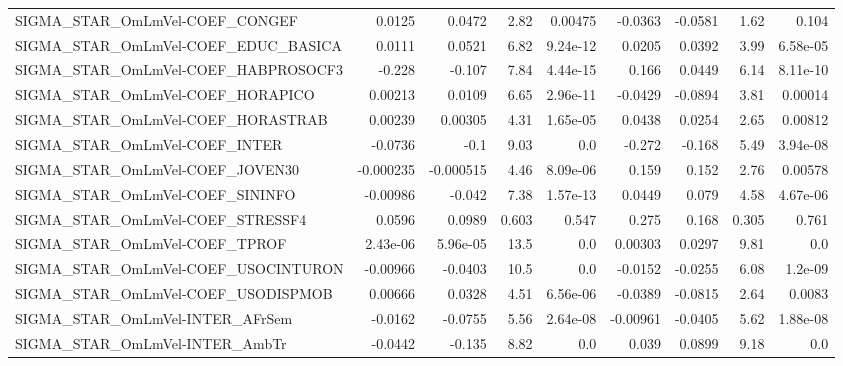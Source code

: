 \begin{tabular}{lrrrrrrrr}
SIGMA\_STAR\_OmLmVel-COEF\_CONGEF         &      0.0125 &       0.0472 &     2.82 &  0.00475 &    -0.0363 &     -0.0581 &         1.62 &         0.104 \\
SIGMA\_STAR\_OmLmVel-COEF\_EDUC\_BASICA    &      0.0111 &       0.0521 &     6.82 & 9.24e-12 &     0.0205 &      0.0392 &         3.99 &      6.58e-05 \\
SIGMA\_STAR\_OmLmVel-COEF\_HABPROSOCF3    &      -0.228 &       -0.107 &     7.84 & 4.44e-15 &      0.166 &      0.0449 &         6.14 &      8.11e-10 \\
SIGMA\_STAR\_OmLmVel-COEF\_HORAPICO       &     0.00213 &       0.0109 &     6.65 & 2.96e-11 &    -0.0429 &     -0.0894 &         3.81 &       0.00014 \\
SIGMA\_STAR\_OmLmVel-COEF\_HORASTRAB      &     0.00239 &      0.00305 &     4.31 & 1.65e-05 &     0.0438 &      0.0254 &         2.65 &       0.00812 \\
SIGMA\_STAR\_OmLmVel-COEF\_INTER          &     -0.0736 &         -0.1 &     9.03 &      0.0 &     -0.272 &      -0.168 &         5.49 &      3.94e-08 \\
SIGMA\_STAR\_OmLmVel-COEF\_JOVEN30        &   -0.000235 &    -0.000515 &     4.46 & 8.09e-06 &      0.159 &       0.152 &         2.76 &       0.00578 \\
SIGMA\_STAR\_OmLmVel-COEF\_SININFO        &    -0.00986 &       -0.042 &     7.38 & 1.57e-13 &     0.0449 &       0.079 &         4.58 &      4.67e-06 \\
SIGMA\_STAR\_OmLmVel-COEF\_STRESSF4       &      0.0596 &       0.0989 &    0.603 &    0.547 &      0.275 &       0.168 &        0.305 &         0.761 \\
SIGMA\_STAR\_OmLmVel-COEF\_TPROF          &    2.43e-06 &     5.96e-05 &     13.5 &      0.0 &    0.00303 &      0.0297 &         9.81 &           0.0 \\
SIGMA\_STAR\_OmLmVel-COEF\_USOCINTURON    &    -0.00966 &      -0.0403 &     10.5 &      0.0 &    -0.0152 &     -0.0255 &         6.08 &       1.2e-09 \\
SIGMA\_STAR\_OmLmVel-COEF\_USODISPMOB     &     0.00666 &       0.0328 &     4.51 & 6.56e-06 &    -0.0389 &     -0.0815 &         2.64 &        0.0083 \\
SIGMA\_STAR\_OmLmVel-INTER\_AFrSem        &     -0.0162 &      -0.0755 &     5.56 & 2.64e-08 &   -0.00961 &     -0.0405 &         5.62 &      1.88e-08 \\
SIGMA\_STAR\_OmLmVel-INTER\_AmbTr         &     -0.0442 &       -0.135 &     8.82 &      0.0 &      0.039 &      0.0899 &         9.18 &           0.0 \\

\end{tabular}
